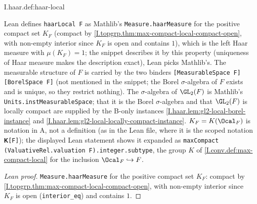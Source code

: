 \begin{definition}
\end{definition}
\begin{tfformal}{I.haar.def:haar-local}
\begin{tffidelity}
Lean defines \texttt{haarLocal F} as Mathlib's \texttt{Measure.haarMeasure} for the positive compact set $K_F$ (compact by \cref{I.topgrp.thm:max-compact-local-compact-open}, with non-empty interior since $K_F$ is open and contains $1$), which is the left Haar measure with $\mu(K_F)=1$; the snippet describes it by this property (uniqueness of Haar measure makes the description exact), Lean picks Mathlib's. The measurable structure of $F$ is carried by the two binders \texttt{[MeasurableSpace F] [BorelSpace F]} (not mentioned in the snippet; the Borel $\sigma$-algebra of $F$ exists and is unique, so they restrict nothing). The $\sigma$-algebra of $\GL_2(F)$ is Mathlib's \texttt{Units.instMeasurableSpace}; that it is the Borel $\sigma$-algebra and that $\GL_2(F)$ is locally compact are supplied by the B-only instances \cref{I.haar.lem:gl2-local-borel-instance} and \cref{I.haar.lem:gl2-local-locally-compact-instance}. $K_F=K(\Ocal_F)$ is notation in A, not a definition (as in the Lean file, where it is the scoped notation \texttt{𝐊[F]}); the displayed Lean statement shows it expanded as \texttt{maxCompact (ValuativeRel.valuation F).integer.subtype}, the group $K$ of \cref{I.conv.def:max-compact-local} for the inclusion $\Ocal_F\hookrightarrow F$.
\end{tffidelity}
\end{tfformal}
\begin{proof}[Lean proof]
\texttt{Measure.haarMeasure} for the positive compact set $K_F$: compact by \cref{I.topgrp.thm:max-compact-local-compact-open}, with non-empty interior since $K_F$ is open (\texttt{interior\_eq}) and contains $1$.
\end{proof}

